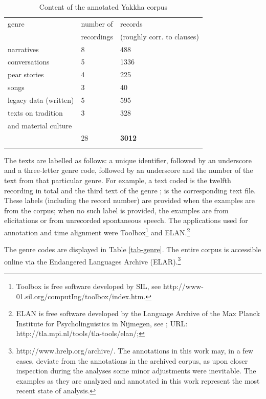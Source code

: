 \begin{table}[htp]
\begin{center}
\begin{tabular}{lll}
\lsptoprule
{\sc genre}&{\sc number of }&{\sc records}\\
& {\sc recordings}& (roughly corr. to clauses)\\
\midrule
narratives	&8&	488\\
conversations	&5&	1336\\
pear stories	&4	&225\\
songs	&3	&40\\
legacy data (written)	&5&	595\\
texts on tradition 	&3	&328\\
and material culture	&	&\\
\midrule
&28&\bf 3012\\
\lspbottomrule
\end{tabular}
\caption{Content of the annotated Yakkha corpus}\label{tab-corpus}
\end{center}
\end{table}


The texts are labelled as follows: a unique identifier, followed by an underscore and a three-letter genre code, followed by an underscore and the number of the text from that particular genre. For example, a text coded  is the twelfth recording in total and the third text of the genre ;  is the corresponding text file. These labels (including the record number) are provided when the examples are from the corpus; when no such label is provided, the examples are from elicitations or from unrecorded spontaneous speech. The applications used for annotation and time alignment were Toolbox\footnote{Toolbox is free software developed by SIL, see http://www-01.sil.org/computIng/toolbox/index.htm.} and ELAN.\footnote{ELAN is free software developed by the Language Archive of the Max Planck Institute for Psycholinguistics in Nijmegen, see  \citet{Wittenburg2008_Annotation}; URL: http://tla.mpi.nl/tools/tla-tools/elan/;}

The genre codes are displayed in Table \ref{tab-genre}.  The entire corpus is accessible online via the Endangered Languages Archive (ELAR).\footnote{http://www.hrelp.org/archive/. The annotations in this work may, in a few cases, deviate from the annotations in the archived corpus, as upon closer inspection during the analyses some minor adjustments were inevitable. The examples as they are analyzed and annotated in this work represent the most recent state of analysis.}

